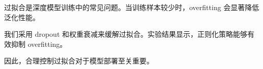 过拟合是深度模型训练中的常见问题。当训练样本较少时，overfitting 会显著降低泛化性能。

我们采用 dropout 和权重衰减来缓解过拟合。实验结果显示，正则化策略能够有效抑制 overfitting。

因此，合理控制过拟合对于模型部署至关重要。
